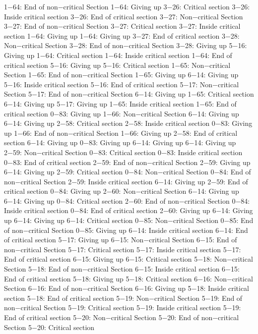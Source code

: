1−64: End of non−critical Section
1−64: Giving up
3−26: Critical section
3−26: Inside critical section
3−26: End of critical section
3−27: Non−critical Section
3−27: End of non−critical Section
3−27: Critical section
3−27: Inside critical section
1−64: Giving up
1−64: Giving up
3−27: End of critical section
3−28: Non−critical Section
3−28: End of non−critical Section
3−28: Giving up
5−16: Giving up
1−64: Critical section
1−64: Inside critical section
1−64: End of critical section
5−16: Giving up
5−16: Critical section
1−65: Non−critical Section
1−65: End of non−critical Section
1−65: Giving up
6−14: Giving up
5−16: Inside critical section
5−16: End of critical section
5−17: Non−critical Section
5−17: End of non−critical Section
6−14: Giving up
1−65: Critical section
6−14: Giving up
5−17: Giving up
1−65: Inside critical section
1−65: End of critical section
0−83: Giving up
1−66: Non−critical Section
6−14: Giving up
6−14: Giving up
2−58: Critical section
2−58: Inside critical section
0−83: Giving up
1−66: End of non−critical Section
1−66: Giving up
2−58: End of critical section
6−14: Giving up
0−83: Giving up
6−14: Giving up
6−14: Giving up
2−59: Non−critical Section
0−83: Critical section
0−83: Inside critical section
0−83: End of critical section
2−59: End of non−critical Section
2−59: Giving up
6−14: Giving up
2−59: Critical section
0−84: Non−critical Section
0−84: End of non−critical Section
2−59: Inside critical section
6−14: Giving up
2−59: End of critical section
0−84: Giving up
2−60: Non−critical Section
6−14: Giving up
6−14: Giving up
0−84: Critical section
2−60: End of non−critical Section
0−84: Inside critical section
0−84: End of critical section
2−60: Giving up
6−14: Giving up
6−14: Giving up
6−14: Critical section
0−85: Non−critical Section
0−85: End of non−critical Section
0−85: Giving up
6−14: Inside critical section
6−14: End of critical section
5−17: Giving up
6−15: Non−critical Section
6−15: End of non−critical Section
5−17: Critical section
5−17: Inside critical section
5−17: End of critical section
6−15: Giving up
6−15: Critical section
5−18: Non−critical Section
5−18: End of non−critical Section
6−15: Inside critical section
6−15: End of critical section
5−18: Giving up
5−18: Critical section
6−16: Non−critical Section
6−16: End of non−critical Section
6−16: Giving up
5−18: Inside critical section
5−18: End of critical section
5−19: Non−critical Section
5−19: End of non−critical Section
5−19: Critical section
5−19: Inside critical section
5−19: End of critical section
5−20: Non−critical Section
5−20: End of non−critical Section
5−20: Critical section
